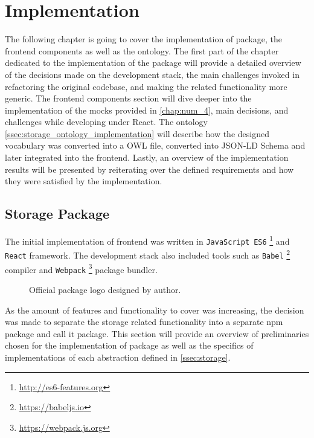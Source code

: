 \chapter{Implementation}
\label{chap:num_5}

The following chapter is going to cover the implementation of \lpas{} package, the frontend components as well as the ontology. The first part of the chapter dedicated to the implementation of the package will provide a detailed overview of the decisions made on the development stack, the main challenges invoked in refactoring the original \lpa{} codebase, and making the \solid{} related functionality more generic. The frontend components section will dive deeper into the implementation of the mocks provided in \autoref{chap:num_4}, main decisions, and challenges while developing under React. The ontology \autoref{ssec:storage_ontology_implementation} will describe how the designed \lpas{} vocabulary was converted into a OWL file, converted into JSON-LD Schema and later integrated into the \lpa{} frontend. Lastly, an overview of the implementation results will be presented by reiterating over the defined \lpa{} requirements and how they were satisfied by the implementation.
 
\section{Storage Package}
\label{ssec_storage_package_implementation}

The initial implementation of \lpa{} frontend was written in \texttt{JavaScript ES6} \footnote{\url{http://es6-features.org}} and \texttt{React} framework. The development stack also included tools such as \texttt{Babel} \footnote{\url{https://babeljs.io}} compiler and \texttt{Webpack} \footnote{\url{https://webpack.js.org}} package bundler. 

\begin{figure}[h]
\centering
{}
\caption{Official \lpas{} package logo designed by author.}
\label{fig:lpa_logo.png}
\end{figure}

As the amount of features and functionality to cover was increasing, the decision was made to separate the \solid{} storage related functionality into a separate npm package and call it \lpas{} package. This section will provide an overview of preliminaries chosen for the implementation of \lpas{} package as well as the specifics of implementations of each abstraction defined in \autoref{ssec:storage}. 

